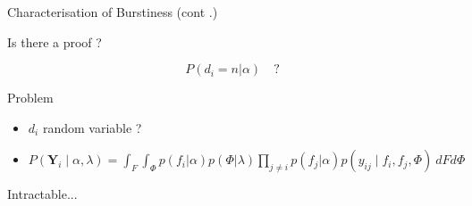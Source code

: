 %
%

\begin{frame}[c]{Characterisation of Burstiness (cont .)}

    Is there a proof ?

    \[ P(d_i=n | \alpha) \quad ?\]
    \begin{block}{Problem}
        \begin{itemize}
            \item $d_i$ random variable ?
            \item $P(\bm{Y}_i \mid \alpha, \lambda) = \int_F \int_\Phi p(f_i| \alpha)p(\Phi|\lambda) \prod_{j\neq i} p(f_j|\alpha) p(y_{ij} \mid f_i, f_j, \Phi) \ dF d\Phi$
        \end{itemize}
    \end{block}

    \alert{Intractable}...
\end{frame}



